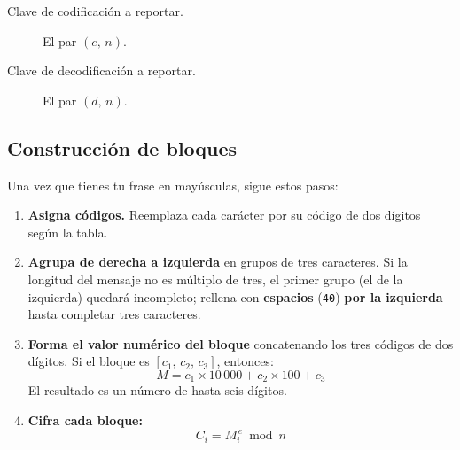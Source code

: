 \documentclass[12pt, oneside]{article}
\begin{document}
\begin{description}
  \item[Clave de codificación a reportar.] El par $(e,\, n)$.
  \item[Clave de decodificación a reportar.] El par $(d,\, n)$.
\end{description}

\subsection{Construcción de bloques}

Una vez que tienes tu frase en mayúsculas, sigue estos pasos:

\begin{enumerate}
  \item \textbf{Asigna códigos.}  Reemplaza cada carácter por su código
        de dos dígitos según la tabla.

  \item \textbf{Agrupa de derecha a izquierda} en grupos de tres
        caracteres.  Si la longitud del mensaje no es múltiplo de tres,
        el primer grupo (el de la izquierda) quedará incompleto; rellena
        con \textbf{espacios} (\texttt{40}) \textbf{por la izquierda}
        hasta completar tres caracteres.

  \item \textbf{Forma el valor numérico del bloque} concatenando los
        tres códigos de dos dígitos.  Si el bloque es
        $[c_1,\, c_2,\, c_3]$, entonces:
        \[
          M = c_1 \times 10\,000 + c_2 \times 100 + c_3
        \]
        El resultado es un número de hasta seis dígitos.

  \item \textbf{Cifra cada bloque:}
        \[
          C_i = M_i^{\,e} \bmod n
        \]
\end{enumerate}
\end{document}
